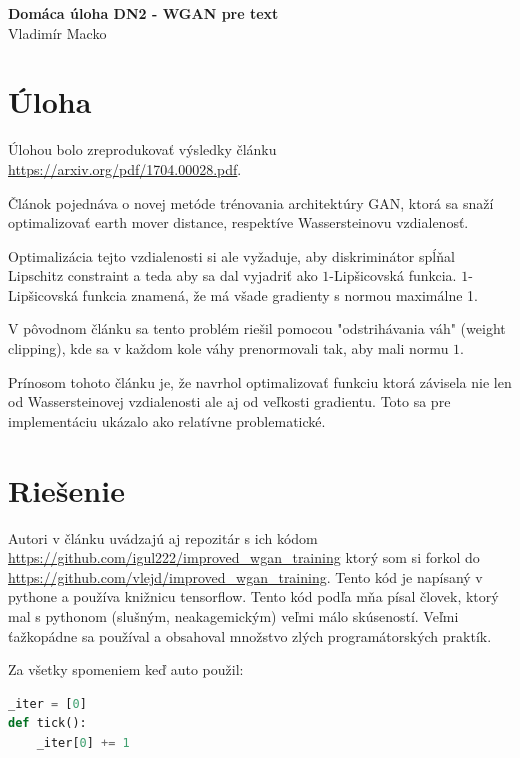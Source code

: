 \documentclass[10pt,a4paper]{article}
\author{Vladimír Macko}
\begin{document}

\begin{center}
\textbf{Domáca úloha DN2 - WGAN pre text} \\
Vladimír Macko
\end{center}
\medskip

\section{Úloha}
Úlohou bolo zreprodukovať výsledky článku \href{https://arxiv.org/pdf/1704.00028.pdf}{https://arxiv.org/pdf/1704.00028.pdf}. 

Článok pojednáva o novej metóde trénovania architektúry GAN, 
ktorá sa snaží optimalizovať earth mover distance, respektíve Wassersteinovu vzdialenosť.

Optimalizácia tejto vzdialenosti si ale vyžaduje, aby diskriminátor spĺňal Lipschitz constraint a teda aby sa dal vyjadriť ako $1$-Lipšicovská funkcia. 
$1$-Lipšicovská funkcia znamená, že má všade gradienty s normou maximálne 1. 

V pôvodnom článku sa tento problém riešil pomocou "odstrihávania váh" (weight clipping), kde sa v každom kole váhy prenormovali tak, aby mali normu $1$.

Prínosom tohoto článku je, že navrhol optimalizovať funkciu ktorá závisela nie len od Wassersteinovej vzdialenosti ale aj od veľkosti gradientu. Toto sa pre implementáciu ukázalo ako relatívne problematické.

\section{Riešenie}

Autori v článku uvádzajú aj repozitár s ich kódom \href{https://github.com/igul222/improved\_wgan\_training}{https://github.com/igul222/improved\_wgan\_training} ktorý som si forkol do \href{https://github.com/vlejd/improved\_wgan\_training}{https://github.com/vlejd/improved\_wgan\_training}. 
Tento kód je napísaný v pythone a používa knižnicu tensorflow.
Tento kód podľa mňa písal človek, ktorý mal s pythonom (slušným, neakagemickým) veľmi málo skúseností. 
Veľmi ťažkopádne sa používal a obsahoval množstvo zlých programátorských praktík.

Za všetky spomeniem keď auto použil:
\begin{lstlisting}[language=Python]
_iter = [0]
def tick():
	_iter[0] += 1
\end{lstlisting}
\end{document}
